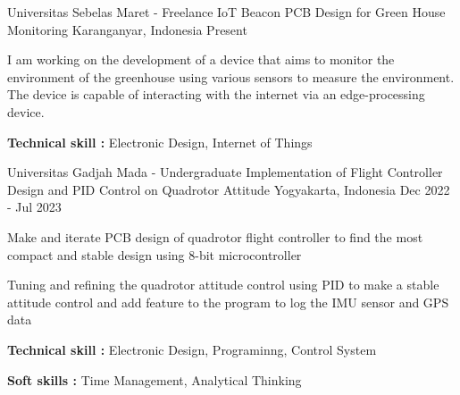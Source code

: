 

\begin{cventries}
	
	\cventry
	{Universitas Sebelas Maret - Freelance} %
	{IoT Beacon PCB Design for Green House Monitoring} %
	{Karanganyar, Indonesia} %
	{Present} %
	{
		\begin{cvitems} %
			\item{I am working on the development of a device that aims to monitor the environment of the greenhouse using various sensors to measure the environment. The device is capable of interacting with the internet via an edge-processing device.}
			\item{\textbf{Technical skill : } Electronic Design, Internet of Things}
		\end{cvitems}
	}

  \cventry
    {Universitas Gadjah Mada - Undergraduate} %
    {Implementation of Flight Controller Design and PID Control on Quadrotor Attitude} %
    {Yogyakarta, Indonesia} %
    {Dec 2022 - Jul 2023} %
    {
      \begin{cvitems} %
        \item {Make and iterate PCB design of quadrotor flight controller to find the most compact and stable design using 8-bit microcontroller}
        \item {Tuning and refining the quadrotor attitude control using PID to make a stable attitude control and add feature to the program to log the IMU sensor and GPS data}
        \item {\textbf{Technical skill : } Electronic Design, Programinng,  Control System}
        \item {\textbf{Soft skills : } Time Management, Analytical Thinking}
      \end{cvitems}
    }
    

\end{cventries}
